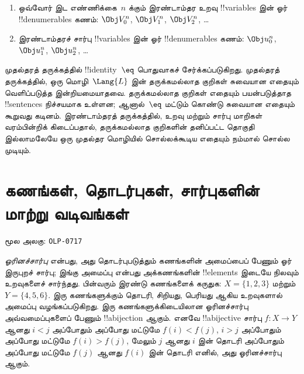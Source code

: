 \documentclass[11pt,a4paper,openany]{memoir}
\begin{document}
\begin{enumerate}
\item ஒவ்வோர் இட எண்ணிக்கை~$n$ க்கும் இரண்டாம்தர உறவு
  !!{variable}s இன் ஓர் !!{denumerable}s கணம்:
  $\Obj V_0^n$, $\Obj V_1^n$, $\Obj V_2^n$, \dots
\item இரண்டாம்தரச் சார்பு !!{variable}s இன் ஓர் !!{denumerable}s கணம்:
  $\Obj u_0^n$, $\Obj u_1^n$, $\Obj u_2^n$, \dots
\end{enumerate}

முதல்தரத் தருக்கத்தில் !!{identity}~$\eq$ பொதுவாகச் சேர்க்கப்படுகிறது.
முதல்தரத் தருக்கத்தில், ஒரு மொழி~$\Lang{L}$ இன் தருக்கமல்லாத குறிகள்
சுவையான எதையும் வெளிப்படுத்த இன்றியமையாதவை. தருக்கமல்லாத குறிகள்
எதையும் பயன்படுத்தாத !!{sentence}s நிச்சயமாக உள்ளன; ஆனால்~$\eq$
மட்டும் கொண்டு சுவையான எதையும் கூறுவது கடினம். இரண்டாம்தரத்
தருக்கத்தில், உறவு மற்றும் சார்பு மாறிகள் வரம்பின்றிக் கிடைப்பதால்,
தருக்கமல்லாத குறிகளின் தனிப்பட்ட தொகுதி இல்லாமலேயே ஒரு முதல்தர
மொழியில் சொல்லக்கூடிய எதையும் நம்மால் சொல்ல முடியும்.




\chapter{கணங்கள், தொடர்புகள், சார்புகளின் மாற்று வடிவங்கள்}
\clearpage
\noindent மூல அலகு: \texttt{OLP-0717}\par




\begin{explain}
\emph{ஓரினச்சார்பு} என்பது, அது தொடர்புபடுத்தும் கணங்களின்
அமைப்பைப் பேணும் ஓர் இருபுறச் சார்பு; இங்கு அமைப்பு என்பது
அக்கணங்களின் !!{element}s இடையே நிலவும் உறவுகளைச் சார்ந்தது.
பின்வரும் இரண்டு கணங்களைக் கருதுக: $X=\{1,2,3\}$ மற்றும்
$Y=\{4,5,6\}$. இரு கணங்களுக்கும் தொடரி, சிறியது,
பெரியது ஆகிய உறவுகளால் அமைப்பு வழங்கப்படுகிறது.
இரு கணங்களுக்கிடையிலான ஓரினச்சார்பு அவ்வமைப்புகளைப் பேணும்
!!a{bijection} ஆகும். எனவே !!a{bijective} சார்பு $f \colon X
\to Y$ ஆனது $i<j$ அப்போதும் அப்போது மட்டுமே $f(i)<f(j)$,
$i>j$ அப்போதும் அப்போது மட்டுமே $f(i)>f(j)$, மேலும் $j$ ஆனது
$i$ இன் தொடரி அப்போதும் அப்போது மட்டுமே $f(j)$ ஆனது
$f(i)$ இன் தொடரி எனில், அது ஓரினச்சார்பு ஆகும்.
\end{explain}
\end{document}
